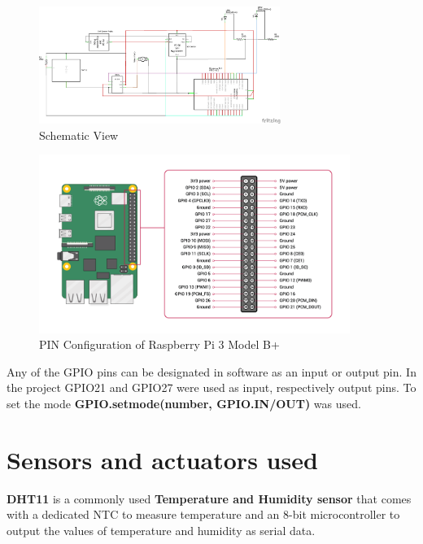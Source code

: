 \documentclass[12pt]{article}
\begin{document}
\begin{figure}[ht]
    \centering
    \includegraphics[width=0.7\textwidth]{images/image7.png}
    \caption{Schematic View}
    \label{fig:pic6}
\end{figure} 

\newpage

\begin{figure}[ht]
    \centering
    \includegraphics[width=0.9\textwidth]{images/image12.png}
    \caption{PIN Configuration of Raspberry Pi 3 Model B+}
    \label{fig:pic7}
\end{figure} 

Any of the GPIO pins can be designated in software as an input or output pin. In the project GPIO21 and GPIO27 were used as input, respectively output pins. To set the mode \textbf{GPIO.setmode(number, GPIO.IN/OUT)} was used.

\section{Sensors and actuators used}

\textbf{DHT11} is a commonly used \textbf{Temperature and Humidity sensor} that comes with a dedicated NTC to measure temperature and an 8-bit microcontroller to output the values of temperature and humidity as serial data.\\
\end{document}
